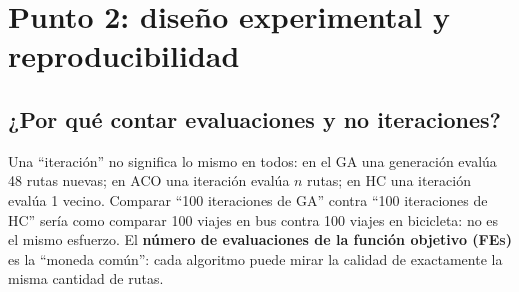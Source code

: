 \documentclass[11pt,a4paper]{article}
\newcommand{\FEs}{\textsc{FEs}}
\begin{document}
\section{Punto 2: diseño experimental y reproducibilidad}\label{sec:p2}

\subsection{¿Por qué contar evaluaciones y no iteraciones?}
\begin{idea}
Una ``iteración'' no significa lo mismo en todos: en el GA una generación evalúa 48 rutas nuevas; en ACO una iteración evalúa $n$ rutas;
en HC una iteración evalúa 1 vecino. Comparar ``100 iteraciones de GA'' contra ``100 iteraciones de HC'' sería como comparar
100 viajes en bus contra 100 viajes en bicicleta: no es el mismo esfuerzo.
El \textbf{número de evaluaciones de la función objetivo (\FEs)} es la ``moneda común'': cada algoritmo puede mirar la calidad de
exactamente la misma cantidad de rutas.
\end{idea}
\end{document}
